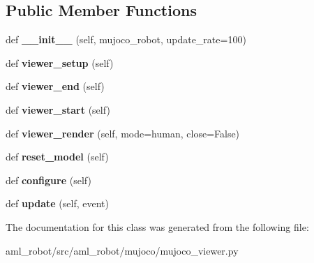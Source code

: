 \subsection*{Public Member Functions}
\begin{DoxyCompactItemize}
\item 
\hypertarget{classaml__robot_1_1mujoco_1_1mujoco__viewer_1_1_mujoco_viewer_a930dba8e19b822639a9ab630d13d0e96}{}\label{classaml__robot_1_1mujoco_1_1mujoco__viewer_1_1_mujoco_viewer_a930dba8e19b822639a9ab630d13d0e96} 
def {\bfseries \+\_\+\+\_\+init\+\_\+\+\_\+} (self, mujoco\+\_\+robot, update\+\_\+rate=100)
\item 
\hypertarget{classaml__robot_1_1mujoco_1_1mujoco__viewer_1_1_mujoco_viewer_ab077677732577ea18dfeecdf1b4eb380}{}\label{classaml__robot_1_1mujoco_1_1mujoco__viewer_1_1_mujoco_viewer_ab077677732577ea18dfeecdf1b4eb380} 
def {\bfseries viewer\+\_\+setup} (self)
\item 
\hypertarget{classaml__robot_1_1mujoco_1_1mujoco__viewer_1_1_mujoco_viewer_ad19733ffbcfa3b0760655b1e2b1727c9}{}\label{classaml__robot_1_1mujoco_1_1mujoco__viewer_1_1_mujoco_viewer_ad19733ffbcfa3b0760655b1e2b1727c9} 
def {\bfseries viewer\+\_\+end} (self)
\item 
\hypertarget{classaml__robot_1_1mujoco_1_1mujoco__viewer_1_1_mujoco_viewer_a7973520f13f58e7e1056050dcef13a13}{}\label{classaml__robot_1_1mujoco_1_1mujoco__viewer_1_1_mujoco_viewer_a7973520f13f58e7e1056050dcef13a13} 
def {\bfseries viewer\+\_\+start} (self)
\item 
\hypertarget{classaml__robot_1_1mujoco_1_1mujoco__viewer_1_1_mujoco_viewer_a3515aa760e7f554fe77a8f3ceea3b7c8}{}\label{classaml__robot_1_1mujoco_1_1mujoco__viewer_1_1_mujoco_viewer_a3515aa760e7f554fe77a8f3ceea3b7c8} 
def {\bfseries viewer\+\_\+render} (self, mode=\textquotesingle{}human\textquotesingle{}, close=False)
\item 
\hypertarget{classaml__robot_1_1mujoco_1_1mujoco__viewer_1_1_mujoco_viewer_acbb6ddf0dde0b62b9a702d3fa71d643b}{}\label{classaml__robot_1_1mujoco_1_1mujoco__viewer_1_1_mujoco_viewer_acbb6ddf0dde0b62b9a702d3fa71d643b} 
def {\bfseries reset\+\_\+model} (self)
\item 
\hypertarget{classaml__robot_1_1mujoco_1_1mujoco__viewer_1_1_mujoco_viewer_af49847f19382cfdbd9e2e633e09efcda}{}\label{classaml__robot_1_1mujoco_1_1mujoco__viewer_1_1_mujoco_viewer_af49847f19382cfdbd9e2e633e09efcda} 
def {\bfseries configure} (self)
\item 
\hypertarget{classaml__robot_1_1mujoco_1_1mujoco__viewer_1_1_mujoco_viewer_a60de01cc08fbf120359e8e6070f9eb8e}{}\label{classaml__robot_1_1mujoco_1_1mujoco__viewer_1_1_mujoco_viewer_a60de01cc08fbf120359e8e6070f9eb8e} 
def {\bfseries update} (self, event)
\end{DoxyCompactItemize}


The documentation for this class was generated from the following file\+:\begin{DoxyCompactItemize}
\item 
aml\+\_\+robot/src/aml\+\_\+robot/mujoco/mujoco\+\_\+viewer.\+py\end{DoxyCompactItemize}
